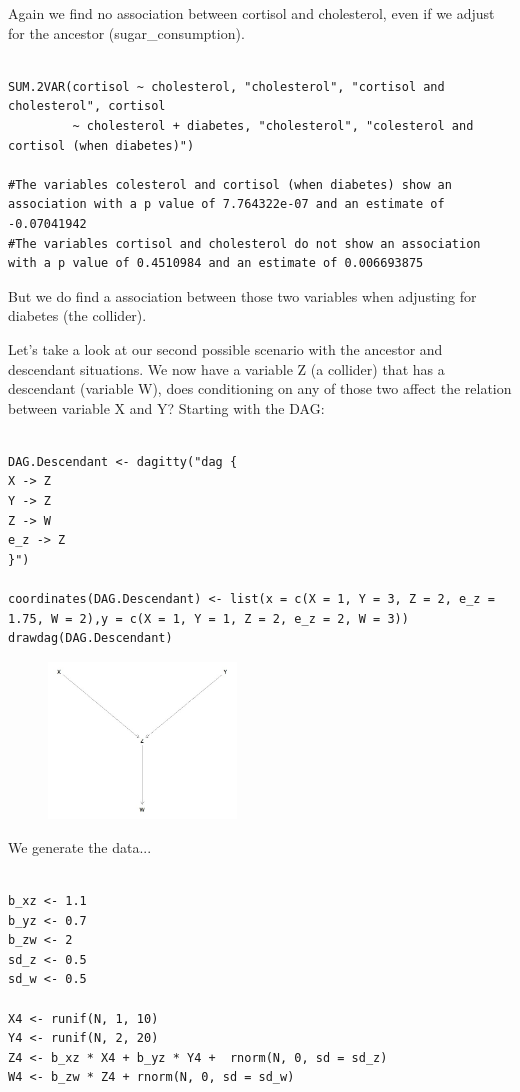 \documentclass{article}
\begin{document}
Again we find no association between cortisol and cholesterol, even if we adjust for the ancestor (sugar\_consumption).



\begin{lstlisting}

SUM.2VAR(cortisol ~ cholesterol, "cholesterol", "cortisol and cholesterol", cortisol 
         ~ cholesterol + diabetes, "cholesterol", "colesterol and cortisol (when diabetes)")

#The variables colesterol and cortisol (when diabetes) show an association with a p value of 7.764322e-07 and an estimate of -0.07041942 
#The variables cortisol and cholesterol do not show an association with a p value of 0.4510984 and an estimate of 0.006693875 

\end{lstlisting}


But we do find a association between those two variables when adjusting for diabetes (the collider).

Let's take a look at our second possible scenario with the ancestor and descendant situations. We now have a variable Z (a collider) that has a descendant (variable W), does conditioning on any of those two affect the relation between variable X and Y?
Starting with the DAG:

\begin{lstlisting}

DAG.Descendant <- dagitty("dag {
X -> Z
Y -> Z
Z -> W
e_z -> Z
}")

coordinates(DAG.Descendant) <- list(x = c(X = 1, Y = 3, Z = 2, e_z = 1.75, W = 2),y = c(X = 1, Y = 1, Z = 2, e_z = 2, W = 3))
drawdag(DAG.Descendant)

\end{lstlisting}


\begin{figure}[h]
\includegraphics[width=5cm]{DAG_DESCENDANT.png}
\centering
\end{figure}


We generate the data...


\begin{lstlisting}

b_xz <- 1.1
b_yz <- 0.7
b_zw <- 2
sd_z <- 0.5
sd_w <- 0.5

X4 <- runif(N, 1, 10)
Y4 <- runif(N, 2, 20)
Z4 <- b_xz * X4 + b_yz * Y4 +  rnorm(N, 0, sd = sd_z)
W4 <- b_zw * Z4 + rnorm(N, 0, sd = sd_w)

\end{lstlisting}
\end{document}
